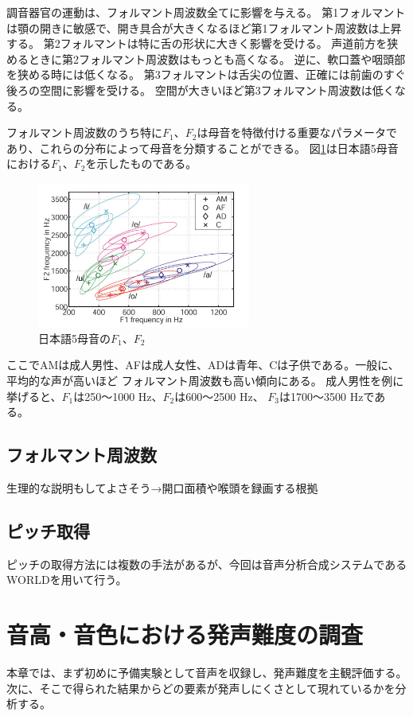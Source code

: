\documentclass[10ptj,a4j,dvipdfmx,uplatex, oneside, openany]{jsbook}%
\begin{document}
調音器官の運動は、フォルマント周波数全てに影響を与える。
第1フォルマントは顎の開きに敏感で、開き具合が大きくなるほど第1フォルマント周波数は上昇する。
第2フォルマントは特に舌の形状に大きく影響を受ける。
声道前方を狭めるときに第2フォルマント周波数はもっとも高くなる。
逆に、軟口蓋や咽頭部を狭める時には低くなる。
第3フォルマントは舌尖の位置、正確には前歯のすぐ後ろの空間に影響を受ける。
空間が大きいほど第3フォルマント周波数は低くなる。

フォルマント周波数のうち特に$F_1$、$F_2$は母音を特徴付ける重要なパラメータであり、これらの分布によって母音を分類することができる\cite{japanese_vowels}。
図\ref{fig:jp_formant}は日本語5母音における$F_1$、$F_2$を示したものである。

\begin{figure}[htbp]
    \begin{center}
      \includegraphics[clip,width=7.0cm]{5母音.png}
      \caption{日本語5母音の$F_1$、$F_2$\cite{japanese_vowels}}
      \label{fig:jp_formant}
    \end{center}
\end{figure}
ここでAMは成人男性、AFは成人女性、ADは青年、Cは子供である。一般に、平均的な声が高いほど
フォルマント周波数も高い傾向にある。
成人男性を例に挙げると、$F_1$は250〜1000 \si{Hz}、$F_2$は600〜2500 \si{Hz}、
$F_3$は1700〜3500 \si{Hz}である\cite{science}。

\section{フォルマント周波数}
生理的な説明もしてよさそう→開口面積や喉頭を録画する根拠

\section{ピッチ取得}
ピッチの取得方法には複数の手法があるが、今回は音声分析合成システムであるWORLD\cite{world}を用いて行う。



\chapter{音高・音色における発声難度の調査}
本章では、まず初めに予備実験として音声を収録し、発声難度を主観評価する。
次に、そこで得られた結果からどの要素が発声しにくさとして現れているかを分析する。
\end{document}
